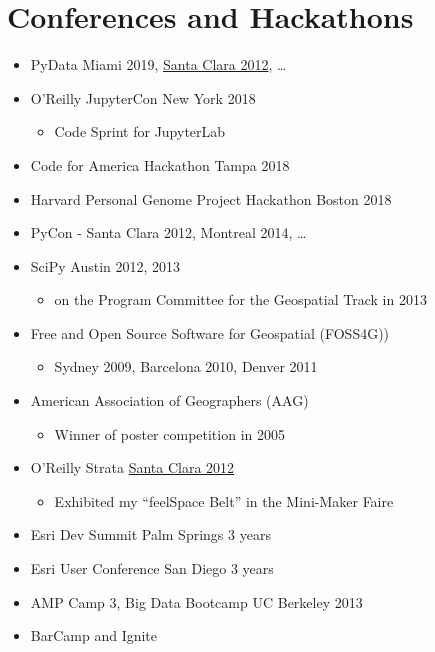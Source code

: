 \documentclass{article}
\newenvironment{mitemize}
               {%
                 \setlength{\parskip}{3pt}
                 \setlength{\itemsep}{2.5pt plus 1pt}
                 \begin{itemize}}
               {\end{itemize}}
\begin{document}
\section*{Conferences and Hackathons}
\begin{mitemize}
\item PyData Miami 2019, \href{https://conferences.oreilly.com/strata/strata2012/public/schedule/detail/23166}{Santa Clara 2012}, \ldots
\item O'Reilly JupyterCon New York 2018
  \begin{mitemize}
  \item Code Sprint for JupyterLab
  \end{mitemize}
  \item Code for America Hackathon Tampa 2018
  \item Harvard Personal Genome Project Hackathon Boston 2018
  \item PyCon - Santa Clara 2012, Montreal 2014, \ldots
  \item SciPy Austin 2012, 2013
    \begin{mitemize}
    \item on the Program Committee for the Geospatial Track in 2013
    \end{mitemize}
  \item Free and Open Source Software for Geospatial (FOSS4G))
    \begin{mitemize}
    \item Sydney 2009, Barcelona 2010, Denver 2011
    \end{mitemize}  
  \item American Association of Geographers (AAG)
    \begin{mitemize}
    \item Winner of poster competition in 2005
    \end{mitemize}
  \item O'Reilly Strata \href{https://conferences.oreilly.com/strata/strata2012}{Santa Clara 2012}
    \begin{mitemize}
    \item Exhibited my ``feelSpace Belt'' in the Mini-Maker Faire
    \end{mitemize}   
  \item Esri Dev Summit Palm Springs 3 years
  \item Esri User Conference San Diego 3 years
  \item AMP Camp 3, Big Data Bootcamp UC Berkeley 2013 
  \item BarCamp and Ignite

\end{mitemize}
\end{document}
